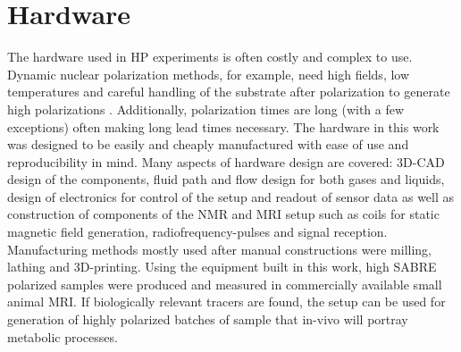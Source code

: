     \section{Hardware}
    The hardware used in HP experiments is often costly and complex to use. Dynamic nuclear polarization methods, for example, need high fields, low temperatures and careful handling of the substrate after polarization to generate high polarizations \cite{ardenkjaer-larsen_present_2016, milani_magnetic_2015}. Additionally, polarization times are long (with a few exceptions) often making long lead times necessary. The hardware in this work was designed to be easily and cheaply manufactured with ease of use and reproducibility in mind. Many aspects of hardware design are covered: 3D-CAD design of the components, fluid path and flow design for both gases and liquids, design of electronics for control of the setup and readout of sensor data as well as construction of components of the NMR and MRI setup such as coils for static magnetic field generation, radiofrequency-pulses and signal reception. Manufacturing methods mostly used after manual constructions were milling, lathing and 3D-printing. Using the equipment built in this work, high SABRE polarized samples were produced and measured in commercially available small animal MRI. If biologically relevant tracers are found, the setup can be used for generation of highly polarized batches of sample that in-vivo will portray metabolic processes.
